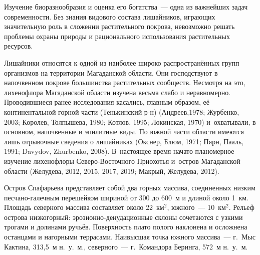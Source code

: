  

\makeProcTitle
{}

Изучение биоразнообразия и оценка его богатства~--- одна из важнейших задач современности. Без знания видового состава лишайников, играющих значительную роль в сложении растительного покрова, невозможно решать проблемы охраны природы и рационального использования растительных ресурсов.

Лишайники относятся к одной из наиболее широко распространённых групп организмов на территории Магаданской области. Они господствуют в напочвенном покрове большинства растительных сообществ. Несмотря на это, лихенофлора Магаданской области изучена весьма слабо и неравномерно. Проводившиеся ранее исследования касались, главным образом, её континентальной горной части (Тенькинский р-н) (Андреев,1978; Журбенко, 2003; Королев, Толпышева, 1980; Котлов, 1995;  Локинская, 1970) и~охватывали, в основном, напочвенные и эпилитные виды. По южной части области имеются лишь отрывочные сведения о лишайниках (Окснер, Блюм, 1971; Пярн, Пааль, 1991; Davydov, Zhurbenko, 2008). В~настоящее время начато планомерное изучение лихенофлоры Северо-Восточного Приохотья и~остров Магаданской области (Желудева, 2012, 2015, 2017, 2019; Макрый, Желудева, 2012).

Остров Спафарьева представляет собой два горных массива, соединенных низким песчано-галечным перешейком шириной от 300 до 600~м и длиной около 1~км. Площадь северного массива составляет около 22~км$^2$, южного~--- 10~км$^2$. Рельеф острова низкогорный: эрозионно-денудационные склоны сочетаются с узкими трогами и долинами ручьёв. Поверхность плато полого наклонена и осложнена останцами и нагорными террасами. Наивысшая точка южного массива~--- г.~Мыс Кактина, 313,5~м н.~у.~м., северного~--- г.~Командора Беринга, 572~м н.~у.~м.

